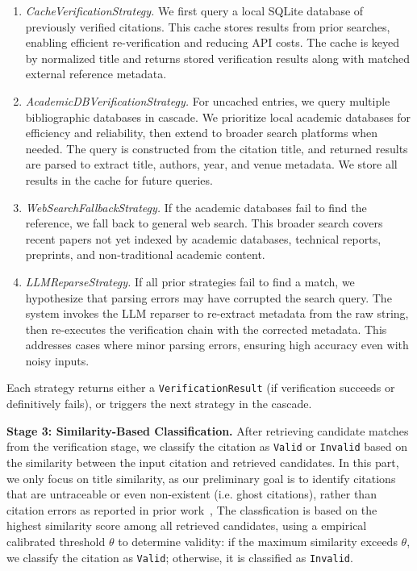 \begin{enumerate}
    \item \textit{CacheVerificationStrategy.}
    We first query a local SQLite database of previously verified citations.
    This cache stores results from prior searches, enabling efficient re-verification and reducing API costs.
    The cache is keyed by normalized title and returns stored verification results along with matched external reference metadata.
    
    \item \textit{AcademicDBVerificationStrategy.}
    For uncached entries, we query multiple bibliographic databases in cascade.
    We prioritize local academic databases for efficiency and reliability, then extend to broader search platforms when needed.
    The query is constructed from the citation title, and returned results are parsed to extract title, authors, year, and venue metadata. We store all results in the cache for future queries.

    \item \textit{WebSearchFallbackStrategy.}
    If the academic databases fail to find the reference, we fall back to general web search.
    This broader search covers recent papers not yet indexed by academic databases, technical reports, preprints, and non-traditional academic content.

    \item \textit{LLMReparseStrategy.}
    If all prior strategies fail to find a match, we hypothesize that parsing errors may have corrupted the search query.
    The system invokes the LLM reparser to re-extract metadata from the raw string, then re-executes the verification chain with the corrected metadata.
    This addresses cases where minor parsing errors, ensuring high accuracy even with noisy inputs.
\end{enumerate}

Each strategy returns either a \texttt{VerificationResult} (if verification succeeds or definitively fails), or triggers the next strategy in the cascade.

\noindent\textbf{Stage 3: Similarity-Based Classification.}
After retrieving candidate matches from the verification stage, we classify the citation as \texttt{Valid} or \texttt{Invalid} based on the similarity between the input citation and retrieved candidates.
In this part, we only focus on title similarity, as our preliminary goal is to identify citations that are untraceable or even non-existent (i.e. ghost citations), rather than citation errors as reported in prior work~\cite{simkin2005stochastic, simkin2003read},
The classfication is based on the highest similarity score among all retrieved candidates, using a empirical calibrated threshold $\theta$ to determine validity: if the maximum similarity exceeds $\theta$, we classify the citation as \texttt{Valid}; otherwise, it is classified as \texttt{Invalid}.

